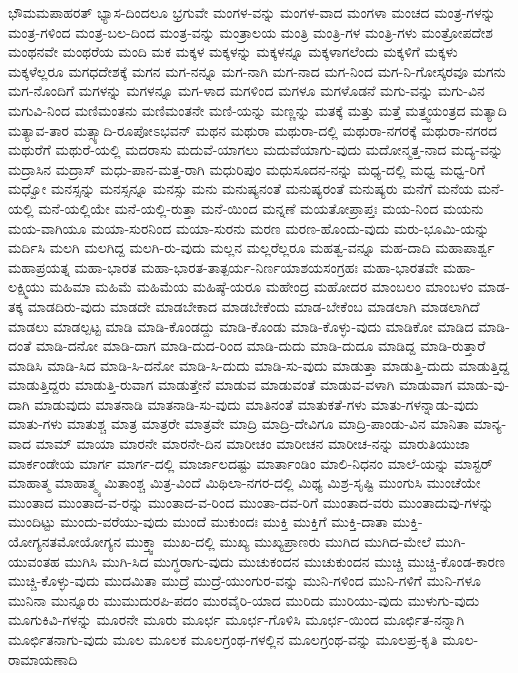{ಭೌಮಮಪಾಹರತ್
ಭ್ಯಾಸ-ದಿಂದಲೂ
ಭ್ರಗುವೇ
ಮಂಗಳ-ವನ್ನು
ಮಂಗಳ-ವಾದ
ಮಂಗಳಾ
ಮಂಚದ
ಮಂತ್ರ-ಗಳನ್ನು
ಮಂತ್ರ-ಗಳಿಂದ
ಮಂತ್ರ-ಬಲ-ದಿಂದ
ಮಂತ್ರ-ವನ್ನು
ಮಂತ್ರಾಲಯ
ಮಂತ್ರಿ
ಮಂತ್ರಿ-ಗಳ
ಮಂತ್ರಿ-ಗಳು
ಮಂತ್ರೋಪದೇಶ
ಮಂಥನವೇ
ಮಂಥರೆಯ
ಮಂದಿ
ಮಕ
ಮಕ್ಕಳ
ಮಕ್ಕಳನ್ನು
ಮಕ್ಕಳನ್ನೂ
ಮಕ್ಕಳಾಗಲೆಂದು
ಮಕ್ಕಳಿಗೆ
ಮಕ್ಕಳು
ಮಕ್ಕಳೆಲ್ಲರೂ
ಮಗಧದೇಶಕ್ಕೆ
ಮಗನ
ಮಗ-ನನ್ನೂ
ಮಗ-ನಾಗಿ
ಮಗ-ನಾದ
ಮಗ-ನಿಂದ
ಮಗ-ನಿ-ಗೋಸ್ಕರವೂ
ಮಗನು
ಮಗ-ನೊಂದಿಗೆ
ಮಗಳನ್ನು
ಮಗಳನ್ನೂ
ಮಗ-ಳಾದ
ಮಗಳಿಂದ
ಮಗಳೂ
ಮಗಳೊಡನೆ
ಮಗು-ವನ್ನು
ಮಗು-ವಿನ
ಮಗುವಿ-ನಿಂದ
ಮಣಿಮಂತನು
ಮಣಿಮಂತನೇ
ಮಣಿ-ಯನ್ನು
ಮಣ್ಣನ್ನು
ಮತಕ್ಕೆ
ಮತ್ತು
ಮತ್ತೆ
ಮತ್ತ್ವಯಂತ್ರದ
ಮತ್ಯಾದಿ
ಮತ್ಯಾವ-ತಾರ
ಮತ್ಸ್ಯಾದಿ-ರೂಪೋಽಭವನ್
ಮಥನ
ಮಥುರಾ
ಮಥುರಾ-ದಲ್ಲಿ
ಮಥುರಾ-ನಗರಕ್ಕೆ
ಮಥುರಾ-ನಗರದ
ಮಥುರೆಗೆ
ಮಥುರೆ-ಯಲ್ಲಿ
ಮದರಾಸು
ಮದುವೆ-ಯಾಗಲು
ಮದುವೆಯಾಗು-ವುದು
ಮದೋನ್ಮತ್ತ-ನಾದ
ಮದ್ಯ-ವನ್ನು
ಮದ್ರಾಸಿನ
ಮದ್ರಾಸ್
ಮಧು-ಪಾನ-ಮತ್ತ-ರಾಗಿ
ಮಧುರಿಪುಂ
ಮಧುಸೂದನ-ನನ್ನು
ಮಧ್ಯ-ದಲ್ಲಿ
ಮಧ್ವ
ಮಧ್ವ-ರಿಗೆ
ಮಧ್ವೋ
ಮನಸ್ಸನ್ನು
ಮನಸ್ಸನ್ನೂ
ಮನಸ್ಸು
ಮನು
ಮನುಷ್ಯನಂತೆ
ಮನುಷ್ಯರಂತೆ
ಮನುಷ್ಯರು
ಮನೆಗೆ
ಮನೆಯ
ಮನೆ-ಯಲ್ಲಿ
ಮನೆ-ಯಲ್ಲಿಯೇ
ಮನೆ-ಯಲ್ಲಿ-ರುತ್ತಾ
ಮನೆ-ಯಿಂದ
ಮನ್ನಣೆ
ಮಯತೋಪ್ರಾಪ್ತಃ
ಮಯ-ನಿಂದ
ಮಯನು
ಮಯ-ವಾಗಿಯೂ
ಮಯಾ-ಸುರನಿಂದ
ಮಯಾ-ಸುರನು
ಮರಣ
ಮರಣ-ಹೊಂದು-ವುದು
ಮರು-ಭೂಮಿ-ಯನ್ನು
ಮರ್ದಿಸಿ
ಮಲಗಿ
ಮಲಗಿದ್ದ
ಮಲಗಿ-ರು-ವುದು
ಮಲ್ಲನ
ಮಲ್ಲರೆಲ್ಲರೂ
ಮಹತ್ವ-ವನ್ನೂ
ಮಹ-ದಾದಿ
ಮಹಾಪಾರ್ಶ್ವ
ಮಹಾಪ್ರಯತ್ನ
ಮಹಾ-ಭಾರತ
ಮಹಾ-ಭಾರತ-ತಾತ್ಪರ್ಯ-ನಿರ್ಣಯಾಶಯಸಂಗ್ರಹಃ
ಮಹಾ-ಭಾರತವೇ
ಮಹಾ-ಲಕ್ಷ್ಮಿಯು
ಮಹಿಮಾ
ಮಹಿಮೆ
ಮಹಿಮೆಯ
ಮಹಿಷ್ಠೆ-ಯರೂ
ಮಹೇಂದ್ರ
ಮಹೋದರ
ಮಾಂಬಲಂ
ಮಾಂಬಳಂ
ಮಾಡ-ತಕ್ಕ
ಮಾಡದಿರು-ವುದು
ಮಾಡದೇ
ಮಾಡಬೇಕಾದ
ಮಾಡಬೇಕೆಂದು
ಮಾಡ-ಬೇಕೆಂಬ
ಮಾಡಲಾಗಿ
ಮಾಡಲಾಗಿದೆ
ಮಾಡಲು
ಮಾಡಲ್ಪಟ್ಟ
ಮಾಡಿ
ಮಾಡಿ-ಕೊಂಡದ್ದು
ಮಾಡಿ-ಕೊಂಡು
ಮಾಡಿ-ಕೊಳ್ಳು-ವುದು
ಮಾಡಿಕೋ
ಮಾಡಿದ
ಮಾಡಿ-ದಂತೆ
ಮಾಡಿ-ದನೋ
ಮಾಡಿ-ದಾಗ
ಮಾಡಿ-ದುದ-ರಿಂದ
ಮಾಡಿ-ದುದು
ಮಾಡಿ-ದುದೂ
ಮಾಡಿದ್ದ
ಮಾಡಿ-ರುತ್ತಾರೆ
ಮಾಡಿಸಿ
ಮಾಡಿ-ಸಿದ
ಮಾಡಿ-ಸಿ-ದನೋ
ಮಾಡಿ-ಸಿ-ದುದು
ಮಾಡಿ-ಸು-ವುದು
ಮಾಡುತ್ತಾ
ಮಾಡುತ್ತಿ-ದುದು
ಮಾಡುತ್ತಿದ್ದ
ಮಾಡುತ್ತಿದ್ದರು
ಮಾಡುತ್ತಿ-ರುವಾಗ
ಮಾಡುತ್ತೇನೆ
ಮಾಡುವ
ಮಾಡುವಂತೆ
ಮಾಡುವ-ವಳಾಗಿ
ಮಾಡುವಾಗ
ಮಾಡು-ವು-ದಾಗಿ
ಮಾಡುವುದು
ಮಾತನಾಡಿ
ಮಾತನಾಡಿ-ಸು-ವುದು
ಮಾತಿನಂತೆ
ಮಾತುಕತೆ-ಗಳು
ಮಾತು-ಗಳನ್ನಾಡು-ವುದು
ಮಾತು-ಗಳು
ಮಾತುಶ್ಚ
ಮಾತ್ರ
ಮಾತ್ರರೇ
ಮಾತ್ರವೇ
ಮಾದ್ರಿ
ಮಾದ್ರಿ-ದೇವಿಗೂ
ಮಾದ್ರಿ-ಪಾಂಡು-ವಿನ
ಮಾನಿತಾ
ಮಾನ್ಯ-ವಾದ
ಮಾಮ್
ಮಾಯಾ
ಮಾರನೇ
ಮಾರನೇ-ದಿನ
ಮಾರೀಚಂ
ಮಾರೀಚನ
ಮಾರೀಚ-ನನ್ನು
ಮಾರುತಿಯುಜಾ
ಮಾರ್ಕಂಡೇಯ
ಮಾರ್ಗ
ಮಾರ್ಗ-ದಲ್ಲಿ
ಮಾರ್ಜಾಲದಷ್ಟು
ಮಾರ್ತಾಂಡಿಂ
ಮಾಲಿ-ನಿಧನಂ
ಮಾಲೆ-ಯನ್ನು
ಮಾಸ್ಟರ್
ಮಾಹಾತ್ಮ
ಮಾಹಾತ್ಮ್ಯ
ಮಿತಾಂಶ್ಚ
ಮಿತ್ರ-ವಿಂದೆ
ಮಿಥಿಲಾ-ನಗರ-ದಲ್ಲಿ
ಮಿಥ್ಯ
ಮಿಶ್ರ-ಸೃಷ್ಟಿ
ಮುಂಗುಸಿ
ಮುಂಚೆಯೇ
ಮುಂತಾದ
ಮುಂತಾದ-ವ-ರನ್ನು
ಮುಂತಾದ-ವ-ರಿಂದ
ಮುಂತಾ-ದವ-ರಿಗೆ
ಮುಂತಾದ-ವರು
ಮುಂತಾದುವು-ಗಳನ್ನು
ಮುಂದಿಟ್ಟು
ಮುಂದು-ವರೆಯು-ವುದು
ಮುಂದೆ
ಮುಕುಂದಃ
ಮುಕ್ತಿ
ಮುಕ್ತಿಗೆ
ಮುಕ್ತಿ-ದಾತಾ
ಮುಕ್ತಿ-ಯೋಗ್ಯನತಮೋಯೋಗ್ಯನ
ಮುಕ್ತ್ವಾ
ಮುಖ-ದಲ್ಲಿ
ಮುಖ್ಯ
ಮುಖ್ಯಪ್ರಾಣರು
ಮುಗಿದ
ಮುಗಿದ-ಮೇಲೆ
ಮುಗಿ-ಯುವಂತಹ
ಮುಗಿಸಿ
ಮುಗಿ-ಸಿದ
ಮುಗ್ಧರಾಗು-ವುದು
ಮುಚುಕಂದನ
ಮುಚುಕುಂದನ
ಮುಚ್ಚಿ
ಮುಚ್ಚಿ-ಕೊಂಡ-ಕಾರಣ
ಮುಚ್ಚಿ-ಕೊಳ್ಳು-ವುದು
ಮುದಮಿತಾ
ಮುದ್ರೆ
ಮುದ್ರೆ-ಯುಂಗುರ-ವನ್ನು
ಮುನಿ-ಗಳಿಂದ
ಮುನಿ-ಗಳಿಗೆ
ಮುನಿ-ಗಳೂ
ಮುನಿನಾ
ಮುನ್ನೂರು
ಮುಮುದುರಪಿ-ಪದಂ
ಮುರವೈರಿ-ಯಾದ
ಮುರಿದು
ಮುರಿಯು-ವುದು
ಮುಳುಗು-ವುದು
ಮೂಗುಕಿವಿ-ಗಳನ್ನು
ಮೂರನೇ
ಮೂರು
ಮೂರ್ಛ
ಮೂರ್ಛ-ಗೊಳಿಸಿ
ಮೂರ್ಛ-ಯಿಂದ
ಮೂರ್ಛಿತ-ನನ್ನಾಗಿ
ಮೂರ್ಛಿತನಾಗು-ವುದು
ಮೂಲ
ಮೂಲಕ
ಮೂಲಗ್ರಂಥ-ಗಳಲ್ಲಿನ
ಮೂಲಗ್ರಂಥ-ವನ್ನು
ಮೂಲಪ್ರ-ಕೃತಿ
ಮೂಲ-ರಾಮಾಯಣಾದಿ
}
